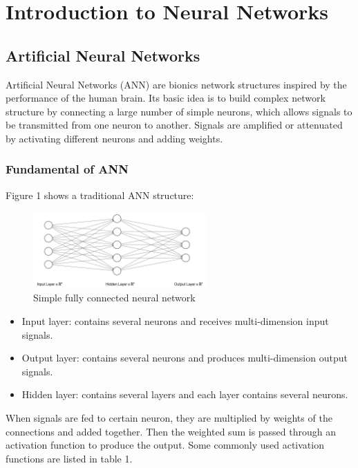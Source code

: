 \section{Introduction to Neural Networks}

\subsection{Artificial Neural Networks}
Artificial Neural Networks (ANN) \cite{haykin2004comprehensive} are bionics network structures inspired by the performance of the human brain. Its basic idea is to build complex network structure by connecting a large number of simple neurons, which allows signals to be transmitted from one neuron to another. Signals are amplified or attenuated by activating different neurons and adding weights.

\subsubsection{Fundamental of ANN}
Figure 1 shows a traditional ANN structure:

\begin{figure}[]
\centering
\includegraphics[width=0.59\textwidth]{figures/ANN_sample.jpg}
\caption{Simple fully connected neural network}
\label{fig:B-B1}
\end{figure}

\begin{itemize}
\item Input layer: contains several neurons and receives multi-dimension input signals.
\item Output layer: contains several neurons and produces multi-dimension output signals.
\item Hidden layer: contains several layers and each layer contains several neurons.
\end{itemize}
When signals are fed to certain neuron, they are multiplied by weights of the connections and added together. Then the weighted sum is passed through an activation function to produce the output. Some commonly used activation functions are listed in table 1.

